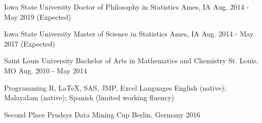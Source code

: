 \documentclass[11pt, a4paper]{awesome-cv}
\begin{document}
\makecvheader

\vspace{1mm}
\begin{cventries}
    \cventry
    {Iowa State University}
    {Doctor of Philosophy in Statistics}
    {Ames, IA}
    {Aug. 2014 - May 2019 (Expected)}
    {
    }
  \end{cventries}
  \vspace*{-\baselineskip}
  \begin{cventries}
    \cventry
    {Iowa State University}
    {Master of Science in Statistics}
    {Ames, IA}
    {Aug. 2014 - May 2017 (Expected)}
    {
    }
  \end{cventries}
  \vspace*{-\baselineskip}
  \begin{cventries}
  \cventry
    {Saint Louis University}
    {Bachelor of Arts in Mathematics and Chemistry}
    {St. Louis, MO}
    {Aug. 2010 - May 2014}
    {
    }
\end{cventries}
\vspace*{-\baselineskip}



\begin{cvskills}
  \cvskill
    {Programming} %
    {R, LaTeX, SAS, JMP, Excel} %
  \cvskill
    {Languages} %
    {English (native); Malayalam (native); Spanish (limited working fluency)} %
\end{cvskills} 

\begin{cvhonors}
  \cvhonor
    {Second Place}
    {Prudsys Data Mining Cup}
    {Berlin, Germany}
    {2016}
 \end{cvhonors}
\end{document}
